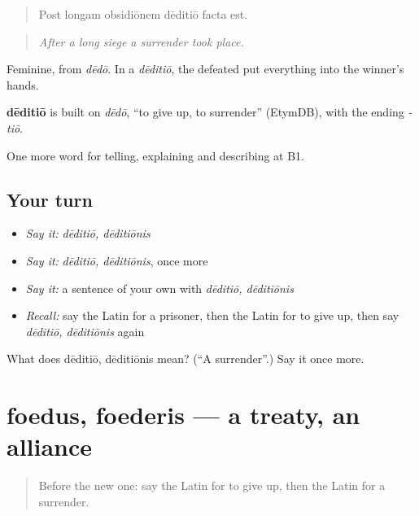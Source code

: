 \begin{quote}
Post longam obsidiōnem dēditiō facta est.
\end{quote}

\begin{quote}
\emph{After a long siege a surrender took place.}
\end{quote}

Feminine, from \emph{dēdō}. In a \emph{dēditiō}, the defeated put everything into the winner's hands.

\begin{cousinweb}
\textbf{dēditiō} is built on \emph{dēdō}, \textquotedblleft{}to give up, to surrender\textquotedblright{} (EtymDB), with the ending \emph{-tiō}.
\end{cousinweb}

\begin{grammarlens}[title={What you've built}]
One more word for telling, explaining and describing at B1.
\end{grammarlens}

\subsection*{Your turn}
\begin{itemize}
\raggedright
  \item \emph{Say it:} \emph{dēditiō, dēditiōnis}
  \item \emph{Say it:} \emph{dēditiō, dēditiōnis}, once more
  \item \emph{Say it:} a sentence of your own with \emph{dēditiō, dēditiōnis}
  \item \emph{Recall:} say the Latin for a prisoner, then the Latin for to give up, then say \emph{dēditiō, dēditiōnis} again
\end{itemize}

\begin{tcolorbox}[breakable,colback=teal!4,colframe=teal!35!black,title={Before you move on}]
What does dēditiō, dēditiōnis mean? (\textquotedblleft{}A surrender\textquotedblright{}.) Say it once more.
\end{tcolorbox}
\section[foedus, foederis]{foedus, foederis — a treaty, an alliance}

\label{lesson:LA-C343-foedus}



\begin{quote}
Before the new one: say the Latin for to give up, then the Latin for a surrender.
\end{quote}

